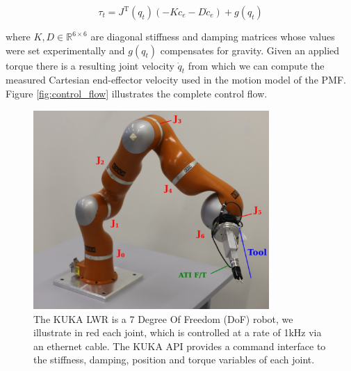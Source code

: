 \documentclass[final,3p,times,twocolumn]{elsarticle}
\begin{document}
\begin{equation}\label{eq:torque_control}
 \tau_t = J^{\mathrm{T}}(q_t)\left(-K c_e - D \dot{c}_e \right) + g(q_t)
\end{equation}

where $K,D \in \mathbb{R}^{6\times6}$ are diagonal stiffness and damping matrices whose values were set experimentally 
and $g(q_t)$ compensates for gravity. Given an applied torque there is a resulting joint velocity $\dot{q}_t$ from which we can compute the measured Cartesian end-effector velocity used in the motion model of the PMF.
Figure \ref{fig:control_flow} illustrates the complete control flow.

\begin{figure}
 \centering
 \includegraphics[width=0.8\textwidth]{./Figures/kuka.pdf}
 \caption{The KUKA LWR is a 7 Degree Of Freedom (DoF) robot, we illustrate in red each joint, which is controlled at a rate of 1kHz via an ethernet cable. The KUKA API provides a command interface to the 
 stiffness, damping, position and torque variables of each joint.}
 \label{fig:kuka}
\end{figure}
\end{document}
